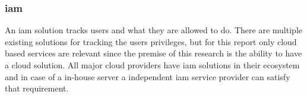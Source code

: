 \subsubsection{\acrfull{iam}}
An \acrshort{iam} solution tracks users and what they are allowed to do. There are multiple existing solutions for tracking the users privileges, but for this report only cloud based services are relevant since the premise of this research is the ability to have a cloud solution. All major cloud providers have \acrshort{iam} solutions in their ecosystem and in case of a in-house server a independent \acrshort{iam} service provider can satisfy that requirement.
